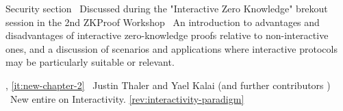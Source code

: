 Security section
\newcol \ccontext\ Discussed during the "Interactive Zero Knowledge" brekout session in the 2nd ZKProof Workshop
				\propContrib\ An introduction to advantages and disadvantages of interactive zero-knowledge proofs relative to non-interactive ones, and a discussion of scenarios and applications where interactive protocols may be particularly suitable or relevant.
				
\newcol {}, \ref{it:new-chapter-2}
\newcol \contributors\ Justin Thaler and Yael Kalai (and further contributors )
				\Chan\ New entire  on Interactivity.
\newcol \ref{rev:interactivity-paradigm}
\rowendL
\myendIssue




